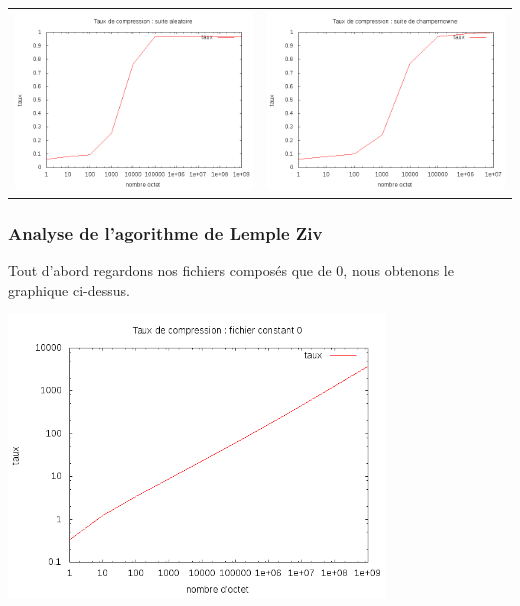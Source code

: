 \documentclass{report}
\begin{document}
\subparagraph*{}
\hspace{-2cm}\begin{tabular}{l | l}
\includegraphics[width=7cm]{aleaH.png} & 
\includegraphics[width=7cm]{champH.png}
\end{tabular}


\subsubsection{ Analyse de l'agorithme de Lemple Ziv}

Tout d'abord regardons nos fichiers composés que de 0, nous obtenons le graphique ci-dessus.
\begin{center}

\includegraphics[width=10cm]{LZConstant.png}

\end{center}
\end{document}
